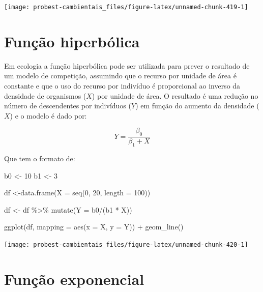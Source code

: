 \documentclass[
]{book}
\newenvironment{Shaded}{\begin{snugshade}}{\end{snugshade}}
\newcommand{\AttributeTok}[1]{\textcolor[rgb]{0.77,0.63,0.00}{#1}}
\newcommand{\DecValTok}[1]{\textcolor[rgb]{0.00,0.00,0.81}{#1}}
\newcommand{\FunctionTok}[1]{\textcolor[rgb]{0.00,0.00,0.00}{#1}}
\newcommand{\NormalTok}[1]{#1}
\newcommand{\OtherTok}[1]{\textcolor[rgb]{0.56,0.35,0.01}{#1}}
\newcommand{\SpecialCharTok}[1]{\textcolor[rgb]{0.00,0.00,0.00}{#1}}
\begin{document}
\begin{center}\texttt{[image: probest-cambientais\_files/figure-latex/unnamed-chunk-419-1]} \end{center}

\hypertarget{funuxe7uxe3o-hiperbuxf3lica}{%
\section{Função hiperbólica}\label{funuxe7uxe3o-hiperbuxf3lica}}

Em ecologia a função hiperbólica pode ser utilizada para prever o resultado de um modelo de competição, assumindo que o recurso por unidade de área é constante e que o uso do recurso por indivíduo é proporcional ao inverso da densidade de organismos (\(X\)) por unidade de área. O resultado é uma redução no número de descendentes por indivíduos (\(Y\)) em função do aumento da densidade (\(X\)) e o modelo é dado por:

\[ Y = \frac{\beta_0}{\beta_1 + X}\]

Que tem o formato de:

\begin{Shaded}
\begin{Highlighting}[]
\NormalTok{b0 }\OtherTok{\textless{}{-}} \DecValTok{10}
\NormalTok{b1 }\OtherTok{\textless{}{-}} \DecValTok{3}

\NormalTok{df }\OtherTok{\textless{}{-}}\FunctionTok{data.frame}\NormalTok{(}\AttributeTok{X =} \FunctionTok{seq}\NormalTok{(}\DecValTok{0}\NormalTok{, }\DecValTok{20}\NormalTok{, }\AttributeTok{length =} \DecValTok{100}\NormalTok{))}

\NormalTok{df }\OtherTok{\textless{}{-}}\NormalTok{ df }\SpecialCharTok{\%\textgreater{}\%} \FunctionTok{mutate}\NormalTok{(}\AttributeTok{Y =}\NormalTok{ b0}\SpecialCharTok{/}\NormalTok{(b1 }\SpecialCharTok{*}\NormalTok{ X))}

\FunctionTok{ggplot}\NormalTok{(df, }\AttributeTok{mapping =} \FunctionTok{aes}\NormalTok{(}\AttributeTok{x =}\NormalTok{ X, }\AttributeTok{y =}\NormalTok{ Y)) }\SpecialCharTok{+}
  \FunctionTok{geom\_line}\NormalTok{()}
\end{Highlighting}
\end{Shaded}

\begin{center}\texttt{[image: probest-cambientais\_files/figure-latex/unnamed-chunk-420-1]} \end{center}

\hypertarget{funuxe7uxe3o-exponencial}{%
\section{Função exponencial}\label{funuxe7uxe3o-exponencial}}
\end{document}
